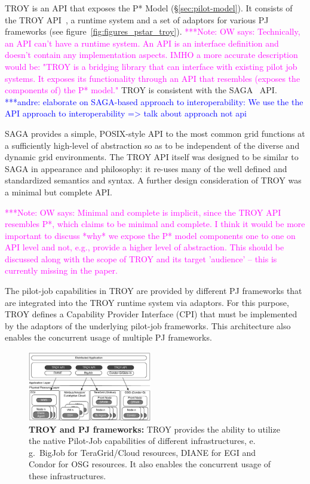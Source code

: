 \documentclass[conference,final]{IEEEtran}
\newcommand{\alnote}[1]{ {\textcolor{blue} { ***andre: #1 }}}
\newcommand{\amnote}[1]{ {\textcolor{blue} { ***andre2: #1 }}}
\newcommand{\note}[1]{ {\textcolor{magenta} { ***Note: #1 }}}
\newcommand{\alnote}[1]{}
\newcommand{\amnote}[1]{}
\newcommand{\note}[1]{}
\newcommand{\upp}{\vspace*{-0.5em}}
\begin{document}

TROY is an API that exposes the P* Model
(\S\ref{sec:pilot-model}). It consists of the TROY
API~\cite{troy_api}, a runtime system and a set of adaptors for
various PJ frameworks (see figure~\ref{fig:figures_pstar_troy}). 
\note{OW says: Technically, an API can't have a runtime system.
An API is an interface definition and doesn't contain any implementation aspects.
IMHO a more accurate description would be: "TROY is a bridging library that can
interface with existing pilot job systems. It exposes its functionality 
through an API that resembles (exposes the components of) the P* model."}
TROY is consistent with the SAGA~\cite{saga_url,saga_gfd90} API. 
\alnote{elaborate on SAGA-based approach to interoperability: We use the the API 
approach to interoperability => talk about approach not api}


SAGA provides a simple, POSIX-style API to the most common grid
functions at a sufficiently high-level of abstraction so as to be
independent of the diverse and dynamic grid environments. The TROY API
itself was designed to be similar to SAGA in appearance and
philosophy: it re-uses many of the well defined and standardized
semantics and syntax. A further design consideration of TROY was a
minimal but complete API.

\note{OW says: Minimal and complete is implicit, since the TROY API
resembles P*, which claims to be minimal and complete. I think it would 
be more important to discuss *why* we expose the P* model components one to one
on API level and not, e.g., provide a higher level of abstraction.
This should be discussed along with the scope of TROY and its
target 'audience' -- this is currently missing in the paper.}

The pilot-job capabilities in TROY are provided by different PJ
frameworks that are integrated into the TROY runtime system via
adaptors. For this purpose, TROY defines a Capability Provider
Interface (CPI) that must be implemented by the adaptors of the
underlying pilot-job frameworks. This architecture also enables the
concurrent usage of multiple PJ frameworks.

\begin{figure}[t]
    \centering
\upp
    \includegraphics[width=0.48\textwidth]{figures/distributed_pilot_job.pdf}
    \caption{\textbf{TROY and PJ frameworks:} TROY provides the
      ability to utilize the native Pilot-Job capabilities of
      different infrastructures, e.\,g.\ BigJob for TeraGrid/Cloud
      resources, DIANE for EGI and Condor for OSG resources. It also
      enables the concurrent usage of these infrastructures.
	\upp\upp\upp}
    \label{fig:figures_distributed_pilot_job}
\end{figure}
\end{document}
